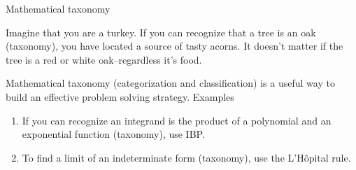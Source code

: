 \documentclass[portrait,fleqn,12pt]{beamer}
\newenvironment{handlist}
   {\begin{enumerate}[\faHandPointRight]
       \addtolength{\itemsep}{0.0\itemsep}}
     {\end{enumerate}}
\begin{document}
\begin{frame}{Mathematical taxonomy}


Imagine that you are a turkey. If you can recognize that a tree is an oak (taxonomy), 
you have located a source of tasty acorns. It doesn't matter if the tree is a red or white oak--regardless
it's food.


 Mathematical taxonomy (categorization  and  classification)  is a useful way to build an effective problem solving strategy. 
 Examples
\begin{handlist}


\item If  you can recognize an integrand is the product of a polynomial and an 
exponential function (taxonomy), use IBP.
\item To find a limit of an indeterminate form  (taxonomy), use the L'Hôpital rule.

\end{handlist}
\end{frame}
\end{document}
